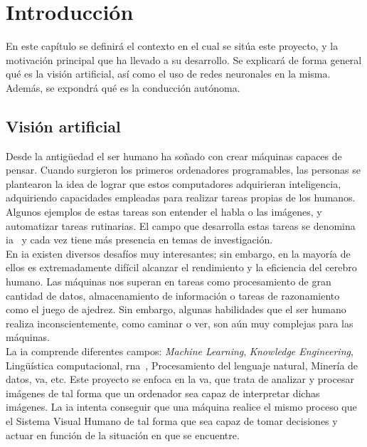 \chapter{Introducción}\label{cap.introduccion}

En este capítulo se definirá el contexto en el cual se sitúa este proyecto, y la motivación principal que ha llevado a su desarrollo. Se explicará de forma general qué es la visión artificial, así como el uso de redes neuronales en la misma. Además, se expondrá qué es la conducción autónoma.

\section{Visión artificial}

Desde la antigüedad el ser humano ha soñado con crear máquinas capaces de pensar. Cuando surgieron los primeros ordenadores programables, las personas se plantearon la idea de lograr que estos computadores adquirieran inteligencia, adquiriendo capacidades empleadas para realizar tareas propias de los humanos. Algunos ejemplos de estas tareas son entender el habla o las imágenes, y automatizar tareas rutinarias. El campo que desarrolla estas tareas se denomina \acrfull{ia}~\cite{Goodfellow} y cada vez tiene más presencia en temas de investigación.\\

En \acrshort{ia} existen diversos desafíos muy interesantes; sin embargo, en la mayoría de ellos es extremadamente difícil alcanzar el rendimiento y la eficiencia del cerebro humano. Las máquinas nos superan en tareas como procesamiento de gran cantidad de datos, almacenamiento de información o tareas de razonamiento como el juego de ajedrez. Sin embargo, algunas habilidades que el ser humano realiza inconscientemente, como caminar o ver, son aún muy complejas para las máquinas.\\

La \acrshort{ia} comprende diferentes campos: \textit{Machine Learning}, \textit{Knowledge Engineering}, Lingüística computacional, \acrfull{rna}~\cite{rna}, Procesamiento del lenguaje natural, Minería de datos, \acrfull{va}, etc. Este proyecto se enfoca en la \acrshort{va}, que trata de analizar y procesar imágenes de tal forma que un ordenador sea capaz de interpretar dichas imágenes. La \acrshort{ia} intenta conseguir que una máquina realice el mismo proceso que el Sistema Visual Humano de tal forma que sea capaz de tomar decisiones y actuar en función de la situación en que se encuentre.\\

